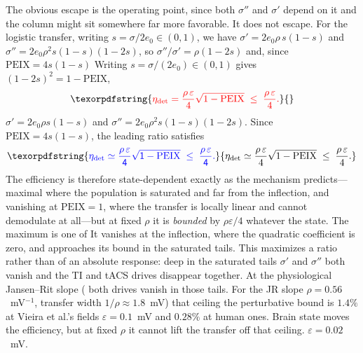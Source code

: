 \documentclass[11pt,a4paper]{article}
\newcommand{\Sig}{\sigma}
\providecommand{\DIFaddtex}[1]{{\protect\color{blue} \sf #1}} %
\providecommand{\DIFdeltex}[1]{{\protect\color{red} \scriptsize #1}} %
\providecommand{\DIFaddbegin}{} %
\providecommand{\DIFaddend}{} %
\providecommand{\DIFdelbegin}{} %
\providecommand{\DIFdelend}{} %
\providecommand{\DIFadd}[1]{\texorpdfstring{\DIFaddtex{#1}}{#1}} %
\providecommand{\DIFdel}[1]{\texorpdfstring{\DIFdeltex{#1}}{}} %
\begin{document}
\DIFdelbegin \DIFdel{The obvious escape is the operating point, since both $\Sig''$ and
$\Sig'$ depend on it and
the column might sit somewhere far more favorable. It does not escape. For the logistic
transfer, writing $s=\Sig/2e_0\in(0,1)$, we have $\Sig'=2e_0\rho\,s(1-s)$ and
$\Sig''=2e_0\rho^2 s(1-s)(1-2s)$, so $\Sig''/\Sig'=\rho(1-2s)$ and, since
$\mathrm{PEIX}=4s(1-s)$ }\DIFdelend \DIFaddbegin \DIFadd{Writing $s=\Sig/(2e_0)\in(0,1)$ }\DIFaddend gives
\DIFdelbegin \DIFdel{$(1-2s)^2=1-\mathrm{PEIX}$, }\begin{displaymath}
\DIFdel{\eta_{\rm det}=\frac{\rho\,\varepsilon}{4}\sqrt{1-\mathrm{PEIX}}\;\le\;\frac{\rho\,\varepsilon}{4}.
}\end{displaymath}%
\DIFdelend \DIFaddbegin \DIFadd{$\Sig'=2e_0\rho s(1-s)$ and
$\Sig''=2e_0\rho^2s(1-s)(1-2s)$. Since
$\mathrm{PEIX}=4s(1-s)$, the leading ratio satisfies
}\begin{equation}
\DIFadd{\eta_{\rm det}\simeq\frac{\rho\,\varepsilon}{4}\sqrt{1-\mathrm{PEIX}}
\;\le\;\frac{\rho\,\varepsilon}{4}.
\label{eq:etabound}
}\end{equation}\DIFaddend
\DIFdelbegin \DIFdel{The efficiency is therefore state-dependent exactly as the mechanism predicts---maximal
where the population is saturated and far from the inflection, and vanishing at
$\mathrm{PEIX}=1$, where the transfer is locally linear and
cannot demodulate at all---but
at fixed $\rho$ it is \emph{bounded} by $\rho\varepsilon/4$ whatever the state. The maximum
is one of }\DIFdelend \DIFaddbegin \DIFadd{It vanishes at the inflection, where the quadratic coefficient is zero, and
approaches its bound in the saturated tails. This maximizes a }\DIFaddend ratio rather than
\DIFdelbegin \DIFdel{of }\DIFdelend \DIFaddbegin \DIFadd{an }\DIFaddend absolute response: \DIFdelbegin \DIFdel{deep in the saturated tails $\Sig'$ and
$\Sig''$ both vanish and the TI and tACS drives disappear together. At the physiological Jansen--Rit slope
(}\DIFdelend \DIFaddbegin \DIFadd{both drives vanish in those tails. For the JR slope
}\DIFaddend $\rho=0.56$~mV$^{-1}$, \DIFdelbegin \DIFdel{transfer width
$1/\rho\!\approx\!1.8$~mV) that ceiling }\DIFdelend \DIFaddbegin \DIFadd{the perturbative bound }\DIFaddend is $1.4\%$ at
\DIFdelbegin \DIFdel{Vieira et al.'s fields }\DIFdelend \DIFaddbegin \DIFadd{$\varepsilon=0.1$~mV }\DIFaddend and $0.28\%$ at \DIFdelbegin \DIFdel{human ones.
Brain state moves the efficiency, but at fixed $\rho$ it cannot lift the
transfer off that ceiling.
}\DIFdelend \DIFaddbegin \DIFadd{$\varepsilon=0.02$~mV.
}\DIFaddend
\end{document}

